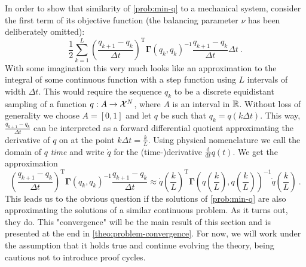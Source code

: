 In order to show that similarity of \cref{prob:min-q} to a mechanical system, consider the first term of its objective function (the balancing parameter $\nu$ has been deliberately omitted):
\begin{equation}
	\label{eq:discrete-lagrangian}
	\frac{1}{2} \sum_{k=1}^{L} \left(\frac{q_{k+1} - q_k}{\Delta t}\right)^\mathrm{T} \mathbf{\Gamma}(q_k, q_k)^{-1} \frac{q_{k+1} - q_k}{\Delta t} \Delta t \ .
\end{equation}
With some imagination this very much looks like an approximation to the integral of some continuous function with a step function using $L$ intervals of width $\Delta t$.
This would require the sequence $q_k$ to be a discrete equidistant sampling of a function $q: A \rightarrow \mathcal{X}^N$, where $A$ is an interval in $\mathbb{R}$.
Without loss of generality we choose $A = [0, 1]$ and let $q$ be such that $q_k = q(k \Delta t)$.
This way, $\frac{q_{k+1} - q_k}{\Delta t}$ can be interpreted as a forward differential quotient approximating the derivative of $q$ on at the point $k \Delta t = \frac{k}{L}$.
Using physical nomenclature we call the domain of $q$ \emph{time} and write $\dot{q}$ for the (time-)derivative $\frac{\mathrm{d}}{\mathrm{d}t}q(t)$.
We get the approximation
\begin{equation}
	\left(\frac{q_{k+1} - q_k}{\Delta t}\right)^\mathrm{T} \mathbf{\Gamma}(q_k, q_k)^{-1} \frac{q_{k+1} - q_k}{\Delta t} 
	\approx \dot{q}\left(\frac{k}{L}\right)^\mathrm{T} \mathbf{\Gamma}\left(q\left(\frac{k}{L}\right), q\left(\frac{k}{L}\right)\right)^{-1}\dot{q}\left(\frac{k}{L}\right) \ .
\end{equation}
This leads us to the obvious question if the solutions of \cref{prob:min-q} are also approximating the solutions of a similar continuous problem.
As it turns out, they do.
This "convergence" will be the main result of this section and is presented at the end in \cref{theo:problem-convergence}.
For now, we will work under the assumption that it holds true and continue evolving the theory, being cautious not to introduce proof cycles.


